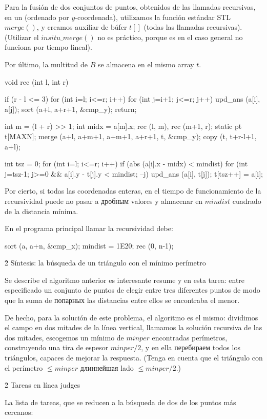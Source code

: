 Para la fusión de dos conjuntos de puntos, obtenidos de las llamadas recursivas, en un (ordenado por $y$-coordenada), utilizamos la función estándar STL $merge()$, y creamos auxiliar de búfer $t[]$ (todas las llamadas recursivas). (Utilizar el $in situ\_merge()$ no es práctico, porque es en el caso general no funciona por tiempo lineal).

Por último, la multitud de $B$ se almacena en el mismo array $t$.

\code
void rec (int l, int r) {
if (r - l <= 3) {
for (int i=l; i<=r; i++)
for (int j=i+1; j<=r; j++)
upd_ans (a[i], a[j]);
sort (a+l, a+r+1, &cmp_y);
return;
}

int m = (l + r) >> 1;
int midx = a[m].x;
rec (l, m), rec (m+1, r);
static pt t[MAXN];
merge (a+l, a+m+1, a+m+1, a+r+1, t, &cmp_y);
copy (t, t+r-l+1, a+l);

int tsz = 0;
for (int i=l; i<=r; i++)
if (abs (a[i].x - midx) < mindist) {
for (int j=tsz-1; j>=0 && a[i].y - t[j].y < mindist; --j)
upd_ans (a[i], t[j]);
t[tsz++] = a[i];
}
}
\endcode

Por cierto, si todas las coordenadas enteras, en el tiempo de funcionamiento de la recursividad puede no pasar a дробным valores y almacenar en $mindist$ cuadrado de la distancia mínima.

En el programa principal llamar la recursividad debe:

\code
sort (a, a+n, &cmp_x);
mindist = 1E20;
rec (0, n-1);
\endcode



\h2{ Síntesis: la búsqueda de un triángulo con el mínimo perímetro }

Se describe el algoritmo anterior es interesante resume y en esta tarea: entre especificado un conjunto de puntos de elegir entre tres diferentes puntos de modo que la suma de попарных las distancias entre ellos se encontraba el menor.

De hecho, para la solución de este problema, el algoritmo es el mismo: dividimos el campo en dos mitades de la línea vertical, llamamos la solución recursiva de las dos mitades, escogemos un mínimo de $minper$ encontradas perímetros, construyendo una tira de espesor $minper / 2$, y en ella перебираем todos los triángulos, capaces de mejorar la respuesta. (Tenga en cuenta que el triángulo con el perímetro $\le minper$ длиннейшая lado $\le minper/2$.)



\h2{ Tareas en línea judges }

La lista de tareas, que se reducen a la búsqueda de dos de los puntos más cercanos:

